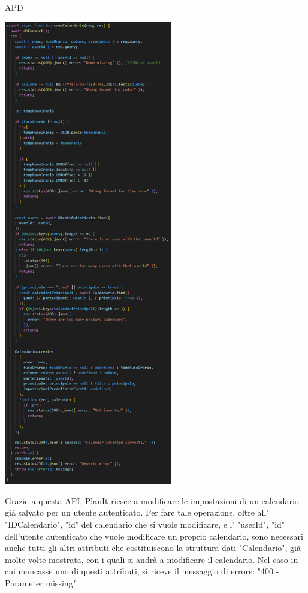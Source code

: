 \begin{listaPersonale} {APD}
\begin{listaPersonale2}[APD]{}
                \begin{center}
                    \includegraphics[width=0.55\textwidth, height=0.9\textheight]{img/png/APIs/creaCalendario.png}
                \end{center}
                Grazie a questa API, PlanIt riesce a modificare le impostazioni di un calendario già salvato per un utente autenticato. Per fare tale operazione, oltre all' "IDCalendario", "id" del calendario che si vuole modificare, e l' "userId", "id" dell'utente autenticato che vuole modificare un proprio calendario, sono necessari anche tutti gli altri attributi che costituiscono la struttura dati "Calendario", già molte volte mostrata, con i quali si andrà a modificare il calendario. Nel caso in cui mancasse uno di questi attributi, si riceve il messaggio di errore: "400 - Parameter missing". \\

\end{listaPersonale2}
\end{listaPersonale}
